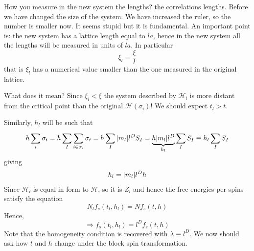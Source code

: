 \documentclass[../main/main.tex]{subfiles}
\begin{document}
How you measure in the new system the lengths? the correlations lengths. Before we have changed the size of the system. We have increased the ruler, so the number is smaller now. It seems stupid but it is fundamental.
An important point is: the new system has a lattice length equal to \( la \), hence in the new system all the lengths will be measured in units of \( la \). In particular
\begin{equation}
  \xi _l = \frac{\xi }{l}
\end{equation}
that is \( \xi _l \) has a numerical value smaller than the one measured in the original lattice.

What does it mean? Since \( \xi _l < \xi  \) the system described by \( \mathcal{H}_l \)   is more distant from the critical point than the original \( \mathcal{H} (\sigma _i) \)! We should expect \( t_l > t \).

Similarly, \( h_l \) will be such that
\begin{equation}
  h \sum_{i}^{} \sigma _i = h \sum_{I}^{} \sum_{i \in \sigma _i}^{}  \sigma _i = h \sum_{I}^{}    \abs{m_l} l^D S_I
  = \underbrace{h \abs{m_l} l^D}_{h_l} \sum_{I}^{} S_I \equiv  h_l \sum_{I}^{} S_I
\end{equation}
giving
\begin{equation}
  h_l = \abs{m_l} l^D h
\end{equation}
Since \( \mathcal{H}_l \) is equal in form to \( \mathcal{H} \), so it is \( Z_l \) and hence the free energies per spins satisfy the equation
\begin{equation}
  N_l f_s (t_l,h_l) = N f_s (t,h)
\end{equation}
Hence,
\begin{equation}
  \Rightarrow  f_s (t_l,h_l) = l^D f_s (t,h)
\end{equation}
Note that the homogeneity condition is recovered with \( \lambda \equiv l^D \).
We now should ask how \( t \) and \( h \) change under the block spin transformation.
\end{document}
